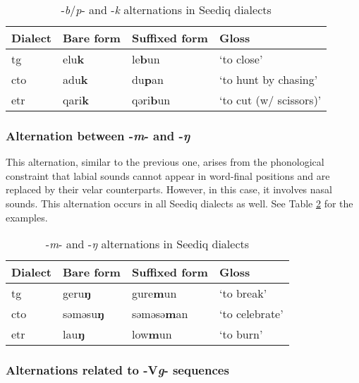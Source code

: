 \begin{table}[]
\centering
\caption{-\textit{b}/\textit{p}- and -\textit{k} alternations in Seediq dialects}
\label{tab:bpk_alt}
\begin{tabular}{llll}
\hline
Dialect   & Bare form & Suffixed form & Gloss                  \\ \hline
\acl{tg}  & elu\textbf{k}      & le\textbf{b}un         & `to close'             \\
\acl{cto} & adu\textbf{k}      & du\textbf{p}an         & `to hunt by chasing'   \\
\acl{etr} & qari\textbf{k}     & qəri\textbf{b}un       & `to cut (w/ scissors)' \\ \hline
\end{tabular}
\end{table}

\subsubsection{Alternation between -\textit{m}- and -\textit{ŋ}}

This alternation, similar to the previous one, arises from the phonological constraint that labial sounds cannot appear in word-final positions and are replaced by their velar counterparts. However, in this case, it involves nasal sounds. This alternation occurs in all Seediq dialects as well. See Table \ref{tab:mng_alt} for the examples. 

\begin{table}[!htbp]
\centering
\caption{-\textit{m}- and -\textit{ŋ} alternations in Seediq dialects}
\label{tab:mng_alt}
\begin{tabular}{llll}
\hline
Dialect   & Bare form & Suffixed form & Gloss          \\ \hline
\acl{tg}  & geru\textbf{ŋ}     & gure\textbf{m}un       & `to break'     \\
\acl{cto} & səməsu\textbf{ŋ}   & səməsə\textbf{m}an     & `to celebrate' \\
\acl{etr} & lau\textbf{ŋ}      & low\textbf{m}un        & `to burn'      \\ \hline
\end{tabular}
\end{table}

\subsubsection{Alternations related to -V\textit{g}- sequences} \label{sec:Vg_alt}

